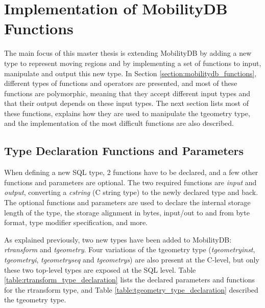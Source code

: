 
\newpage

\section{Implementation of MobilityDB Functions}
\label{section:general_functions}

The main focus of this master thesis is extending MobilityDB by adding a new type to represent moving regions and by implementing a set of functions to input, manipulate and output this new type. In Section \ref{section:mobilitydb_functions}, different types of functions and operators are presented, and most of these functions are polymorphic, meaning that they accept different input types and that their output depends on these input types. The next section lists most of these functions, explains how they are used to manipulate the tgeometry type, and the implementation of the most difficult functions are also described.

\subsection{Type Declaration Functions and Parameters}
\label{section:type_declaration}

When defining a new SQL type, 2 functions have to be declared, and a few other functions and parameters are optional. The two required functions are \textit{input} and \textit{output}, converting a \textit{cstring} (C string type) to the newly declared type and back. The optional functions and parameters are used to declare the internal storage length of the type, the storage alignment in bytes, input/out to and from byte format, type modifier specification, and more.

As explained previously, two new types have been added to MobilityDB: \textit{rtransform} and \textit{tgeometry}. Four variations of the tgeometry type (\textit{tgeometryinst}, \textit{tgeometryi}, \textit{tgeometryseq} and \textit{tgeometrys}) are also present at the C-level, but only these two top-level types are exposed at the SQL level. Table \ref{table:rtransform_type_declaration} lists the declared parameters and functions for the rtransform type, and Table \ref{table:tgeometry_type_declaration} described the tgeometry type.

